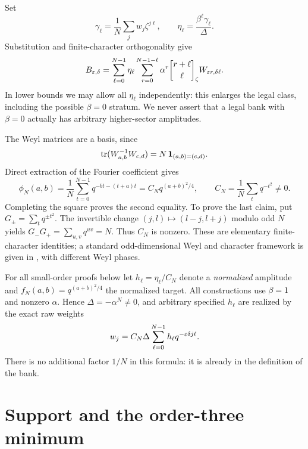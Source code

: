 \documentclass[11pt,letterpaper]{article}
\theoremstyle{definition}\newtheorem{definition}[theorem]{Definition}
\newcommand{\gb}[3]{\genfrac{[}{]}{0pt}{}{#1}{#2}_{#3}}
\begin{document}
Set
\[
 \gamma_\ell=\frac1N\sum_jw_j\zeta^{j\ell},\qquad
 \eta_\ell=\frac{\beta^\ell\gamma_\ell}{\Delta}.
\]
Substitution and finite-character orthogonality give
\begin{equation}\label{eq:expansion}
 B_{\eps,\delta}
 =\sum_{\ell=0}^{N-1}\eta_\ell
   \sum_{r=0}^{N-1-\ell}\alpha^r
   \gb{r+\ell}{\ell}{\zeta}W_{\eps r,\delta\ell}.
\end{equation}
In lower bounds we may allow all $\eta_\ell$ independently: this enlarges the legal class, including the possible $\beta=0$ stratum. We never assert that a legal bank with $\beta=0$ actually has arbitrary higher-sector amplitudes.

The Weyl matrices are a basis, since
\[
 \operatorname{tr}(W_{a,b}^{-1}W_{c,d})=N\,\mathbf1_{(a,b)=(c,d)}.
\]
Direct extraction of the Fourier coefficient gives
\begin{equation}\label{eq:fouriercoef}
 \phi_N(a,b)=\frac1N\sum_{t=0}^{N-1}q^{-bt-(t+a)t}
 = C_N q^{(a+b)^2/4},\qquad
 C_N=\frac1N\sum_tq^{-t^2}\ne0.
\end{equation}
Completing the square proves the second equality. To prove the last claim, put $G_\pm=\sum_tq^{\pm t^2}$. The invertible change $(j,l)\mapsto(l-j,l+j)$ modulo odd $N$ yields
$G_-G_+=\sum_{u,v}q^{uv}=N$. Thus $C_N$ is nonzero. These are elementary finite-character identities; a standard odd-dimensional Weyl and character framework is given in \cite[Section II A--D]{Gross}, with different Weyl phases.

For all small-order proofs below let $h_\ell=\eta_\ell/C_N$ denote a \emph{normalized} amplitude and $f_N(a,b)=q^{(a+b)^2/4}$ the normalized target. All constructions use $\beta=1$ and nonzero $\alpha$. Hence $\Delta=-\alpha^N\ne0$, and arbitrary specified $h_\ell$ are realized by the exact raw weights
\begin{equation}\label{eq:weights}
 w_j=C_N\Delta\sum_{\ell=0}^{N-1}h_\ell q^{-\varepsilon\delta j\ell}.
\end{equation}
There is no additional factor $1/N$ in this formula: it is already in the definition of the bank.

\section{Support and the order-three minimum}\label{sec:n3}
\end{document}
